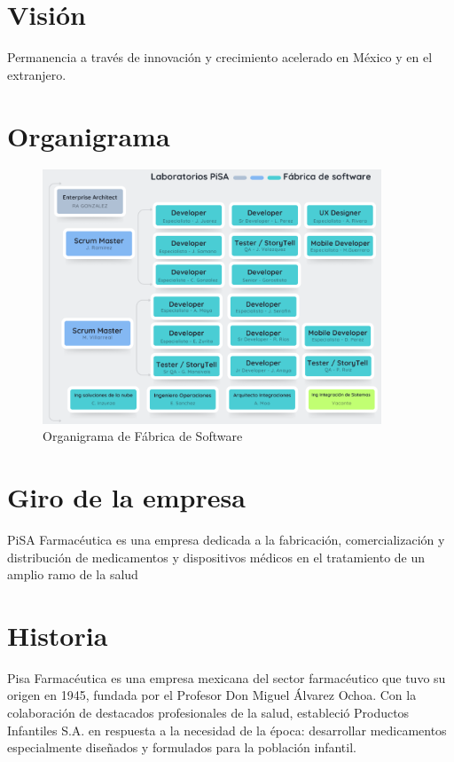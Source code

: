 \documentclass[12pt,letterpaper,spanish, xcolor=table]{report}
\numberwithin{figure}{subsection}
\begin{document}
\section{Visión}
Permanencia a través de innovación y crecimiento acelerado en México y en el extranjero.
	
\section{Organigrama}

\begin{figure}[H]
	\centering
	\includegraphics[width=0.9\textwidth]{Imagenes/OrganigramaPisa.png}
	\caption{Organigrama de Fábrica de Software}\label{a1}
\end{figure}
	
\section{Giro de la empresa}

PiSA Farmacéutica es una empresa dedicada a la fabricación, comercialización y distribución de medicamentos y dispositivos médicos en el tratamiento de un amplio ramo de la salud

\section{Historia}

Pisa Farmacéutica es una empresa mexicana del sector farmacéutico que tuvo su origen en 1945, fundada por el Profesor Don Miguel Álvarez Ochoa. Con la colaboración de destacados profesionales de la salud, estableció Productos Infantiles S.A. en respuesta a la necesidad de la época: desarrollar medicamentos especialmente diseñados y formulados para la población infantil.\\
\end{document}
